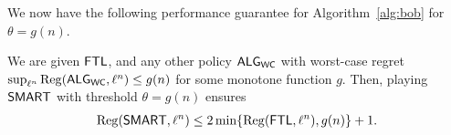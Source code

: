 We now have the following performance guarantee for Algorithm~\ref{alg:bob} for $\theta=g(n)$.
\begin{theorem}  
\label{thm:2ApproxRegret}
      We are given $\mathsf{FTL}$, and any other policy $\mathsf{ALG}_{\mathsf{WC}}$ with worst-case regret $\sup_{\ell^n} \mathrm{Reg}(\mathsf{ALG}_{\mathsf{WC}}, \ell^n) \le g(n)$
      for some monotone function $g$. Then, playing $\mathsf{SMART}$ with threshold $\theta = g(n)$ ensures 
    \begin{align} \label{eq:2ApproxReg}
        \mathrm{Reg}(\mathsf{SMART}, \ell^n) \le 2 \min\{\mathrm{Reg}(\mathsf{FTL},\ell^n),g(n)\} + 1.
    \end{align}
\end{theorem}

